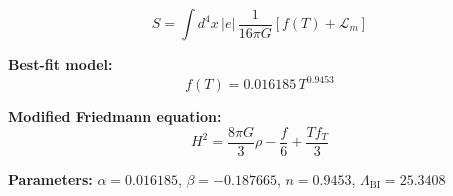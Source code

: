
\begin{equation}
  S = \int d^4x \, |e| \, \frac{1}{16\pi G} \left[ f(T) + \mathcal{L}_m \right]
\end{equation}

\textbf{Best-fit model:}
\begin{equation}
  f(T) = 0.016185 \, T^{0.9453}
\end{equation}

\textbf{Modified Friedmann equation:}
\begin{equation}
  H^2 = \frac{8\pi G}{3} \rho - \frac{f}{6} + \frac{T f_T}{3}
\end{equation}

\textbf{Parameters:}
$\alpha = 0.016185$, \quad
$\beta = -0.187665$, \quad
$n = 0.9453$, \quad
$\Lambda_{\text{BI}} = 25.3408$